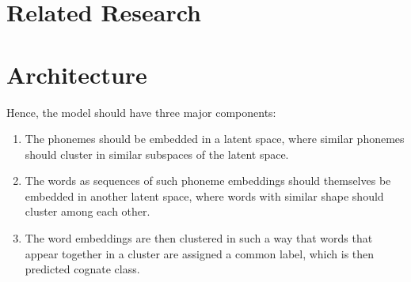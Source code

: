 \documentclass[6pt]{article}
\begin{document}
% 
%
%



\section{Related Research}
\section{Architecture}

Hence, the model should have three major components:
\begin{enumerate}
\item The phonemes should be embedded in a latent space, where similar phonemes should cluster in similar subspaces of the latent space.
\item The words as sequences of such phoneme embeddings should themselves be embedded in another latent space, where words with similar shape should cluster among each other. 
\item The word embeddings are then clustered in such a way that words that appear together in a cluster are assigned a common label, which is then predicted cognate class.
\end{enumerate}
\end{document}
